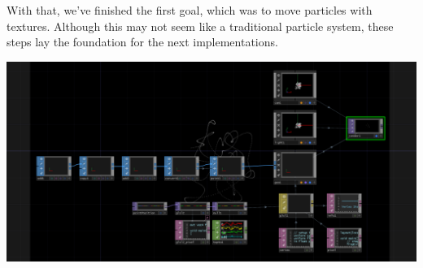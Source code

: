 \begin{fullwidth}
With that, we've finished the first goal, which was to move particles with textures. Although this may not seem like a traditional particle system, these steps lay the foundation for the next implementations.

\begin{center}
\includegraphics{./img/12.6.2/final_step.png}
\end{center}


\end{fullwidth}


